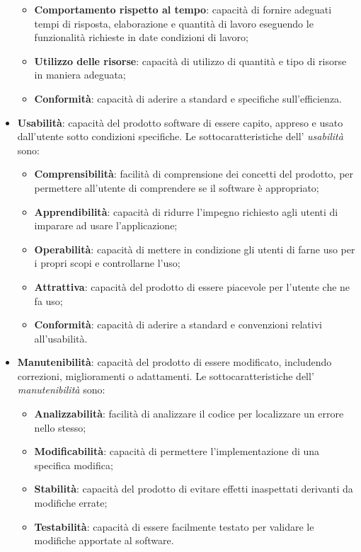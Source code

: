\begin{itemize}
	\begin{itemize}
	\item \textbf{Comportamento rispetto al tempo}: capacità di fornire adeguati tempi di risposta, elaborazione e quantità di lavoro eseguendo le funzionalità richieste in date condizioni di lavoro;
	\item \textbf{Utilizzo delle risorse}: capacità di utilizzo di quantità e tipo di risorse in maniera adeguata;
	\item \textbf{Conformità}: capacità di aderire a standard e specifiche sull'efficienza.
	\end{itemize}
\item \textbf{Usabilità}: capacità del prodotto software di essere capito, appreso e usato dall'utente sotto condizioni specifiche. Le sottocaratteristiche dell' \textit{usabilità} sono:
	\begin{itemize}
	\item \textbf{Comprensibilità}: facilità di comprensione dei concetti del prodotto, per permettere all'utente di comprendere se il software è appropriato;
	\item \textbf{Apprendibilità}: capacità di ridurre l'impegno richiesto agli utenti di imparare ad usare l'applicazione;
	\item \textbf{Operabilità}: capacità di mettere in condizione gli utenti di farne uso per i propri scopi e controllarne l'uso;
	\item \textbf{Attrattiva}: capacità del prodotto di essere piacevole per l'utente che ne fa uso;
	\item \textbf{Conformità}: capacità di aderire a standard e convenzioni relativi all'usabilità.
	\end{itemize}
\item \textbf{Manutenibilità}: capacità del prodotto di essere modificato, includendo correzioni, miglioramenti o adattamenti. Le sottocaratteristiche dell' \textit{manutenibilità} sono:
	\begin{itemize}
	\item \textbf{Analizzabilità}: facilità di analizzare il codice per localizzare un errore nello stesso;
	\item \textbf{Modificabilità}: capacità di permettere l'implementazione di una specifica modifica;
	\item \textbf{Stabilità}: capacità del prodotto di evitare effetti inaspettati derivanti da modifiche errate;
	\item \textbf{Testabilità}: capacità di essere facilmente testato per validare le modifiche apportate al software.

\end{itemize}
\end{itemize}
